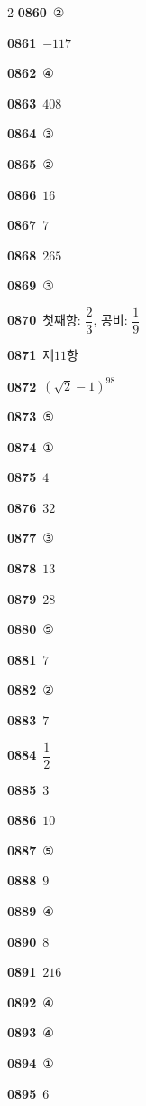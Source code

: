 \documentclass[10pt,a4paper]{article}
\begin{document}
\begin{multicols}{2}
\noindent\textbf{0860}\ ②\par
\noindent\textbf{0861}\ $-117$\par
\noindent\textbf{0862}\ ④\par
\noindent\textbf{0863}\ $408$\par
\noindent\textbf{0864}\ ③\par
\noindent\textbf{0865}\ ②\par
\noindent\textbf{0866}\ $16$\par
\noindent\textbf{0867}\ $7$\par
\noindent\textbf{0868}\ $265$\par
\noindent\textbf{0869}\ ③\par
\noindent\textbf{0870}\ 첫째항: $\dfrac{2}{3}$, 공비: $\dfrac{1}{9}$\par
\noindent\textbf{0871}\ 제$11$항\par
\noindent\textbf{0872}\ $(\sqrt{2}-1)^{98}$\par
\noindent\textbf{0873}\ ⑤\par
\noindent\textbf{0874}\ ①\par
\noindent\textbf{0875}\ $4$\par
\noindent\textbf{0876}\ $32$\par
\noindent\textbf{0877}\ ③\par
\noindent\textbf{0878}\ $13$\par
\noindent\textbf{0879}\ $28$\par
\noindent\textbf{0880}\ ⑤\par
\noindent\textbf{0881}\ $7$\par
\noindent\textbf{0882}\ ②\par
\noindent\textbf{0883}\ $7$\par
\noindent\textbf{0884}\ $\dfrac{1}{2}$\par
\noindent\textbf{0885}\ $3$\par
\noindent\textbf{0886}\ $10$\par
\noindent\textbf{0887}\ ⑤\par
\noindent\textbf{0888}\ $9$\par
\noindent\textbf{0889}\ ④\par
\noindent\textbf{0890}\ $8$\par
\noindent\textbf{0891}\ $216$\par
\noindent\textbf{0892}\ ④\par
\noindent\textbf{0893}\ ④\par
\noindent\textbf{0894}\ ①\par
\noindent\textbf{0895}\ $6$\par

\end{multicols}
\end{document}
